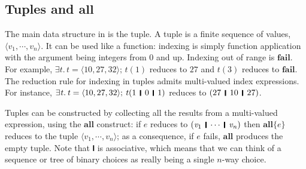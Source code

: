 \documentclass[acmsmall,review,anonymous,dvipsnames]{acmart}
\newcommand{\Varid}[1]{\mathit{#1}}
\begin{document}
\subsection{Tuples and \ensuremath{\textbf{all}}} \label{sec:tuple}
The main data structure in \versecalc{} is the tuple.
A tuple is a finite sequence of values, \ensuremath{\langle{}\Varid{v}_{\mathrm{1}},\cdots,\Varid{v}_{\Varid{n}}\rangle}.
It can be used like a function: indexing is simply function application
with the argument being integers from 0 and up.  Indexing out of range is \ensuremath{\textbf{fail}}.
For example, \ensuremath{\exists\Varid{t}.\,\Varid{t}\mathrel{=}\langle{}\mathrm{10},\mathrm{27},\mathrm{32}\rangle;\,\Varid{t}(\mathrm{1})} reduces to \ensuremath{\mathrm{27}} and \ensuremath{\Varid{t}(\mathrm{3})} reduces to \ensuremath{\textbf{fail}}.
The reduction rule for indexing in tuples admits multi-valued index expressions.
For instance, \ensuremath{\exists\Varid{t}.\,\Varid{t}\mathrel{=}\langle{}\mathrm{10},\mathrm{27},\mathrm{32}\rangle;\,\Varid{t}(\mathrm{1}\hspace{1mm}\mathop{\rule[-0.3mm]{0.5mm}{2.5mm}}\hspace{1mm}\mathrm{0}\hspace{1mm}\mathop{\rule[-0.3mm]{0.5mm}{2.5mm}}\hspace{1mm}\mathrm{1})} reduces to \ensuremath{(\mathrm{27}\hspace{1mm}\mathop{\rule[-0.3mm]{0.5mm}{2.5mm}}\hspace{1mm}\mathrm{10}\hspace{1mm}\mathop{\rule[-0.3mm]{0.5mm}{2.5mm}}\hspace{1mm}\mathrm{27})}.

Tuples can be constructed by collecting all the results from a multi-valued expression, using the \ensuremath{\textbf{all}} construct:
if \ensuremath{\Varid{e}} reduces to \ensuremath{(\Varid{v}_{\mathrm{1}}\hspace{1mm}\mathop{\rule[-0.3mm]{0.5mm}{2.5mm}}\hspace{1mm}\cdots\hspace{1mm}\mathop{\rule[-0.3mm]{0.5mm}{2.5mm}}\hspace{1mm}\Varid{v}_{\Varid{n}})} then \ensuremath{\textbf{all}\{\Varid{e}\}} reduces to
the tuple \ensuremath{\langle{}\Varid{v}_{\mathrm{1}},\cdots,\Varid{v}_{\Varid{n}}\rangle};
as a consequence, if $e$ fails, \ensuremath{\textbf{all}} produces the empty tuple.
Note that \ensuremath{\rule[-0.3mm]{0.5mm}{2.5mm}} is associative, which means that we
can think of a sequence or tree of binary choices as really being a single
$n$-way choice.
\label{sec:all}
\end{document}
